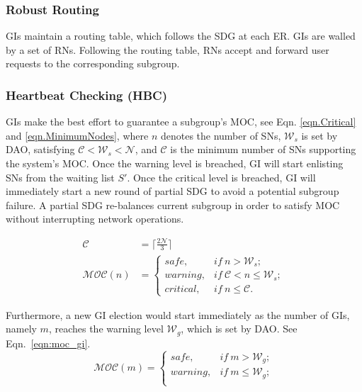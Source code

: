 \subsubsection{Robust Routing}

GIs maintain a routing table, which follows the SDG at each ER. GIs are walled by a set of RNs. Following the routing table, RNs accept and forward user requests to the corresponding subgroup.

\subsubsection{Heartbeat Checking (HBC)}
GIs make the best effort to guarantee a subgroup's MOC, see Eqn. \ref{eqn.Critical} and \ref{eqn.MinimumNodes}, where \(n\) denotes the number of SNs, $\mathcal{W}_s$ is set by DAO, satisfying $\mathcal{C}<\mathcal{W}_s<\mathcal{N}$, and $\mathcal{C}$ is the minimum number of SNs supporting the system's MOC. Once the warning level is breached, GI will start enlisting SNs from the waiting list ${S'}$. Once the critical level is breached, GI will immediately start a new round of partial SDG to avoid a potential subgroup failure. A partial SDG re-balances current subgroup in order to satisfy MOC without interrupting network operations.

\begin{align}
\mathcal{C} &= \lceil \frac{2\mathcal{N}}{3} \rceil \label{eqn.Critical}\\
\mathcal{MOC}(n) &= \begin{cases}
                  safe,     & if \ n > \mathcal{W}_s;\\
                  warning,  & if \ \mathcal{C} < n\le \mathcal{W}_s; \\
        	      critical, & if \ n \le \mathcal{C}.
        		   \end{cases}
\label{eqn.MinimumNodes}
\end{align}

Furthermore, a new GI election would start immediately as the number of GIs, namely $m$, reaches the warning level $\mathcal{W}_g$, which is set by DAO. See Eqn.~\ref{eqn:moc_gi}.
\begin{equation}
\mathcal{MOC}(m) = \begin{cases}
                  safe,     & if \ m > \mathcal{W}_g;\\
                  warning,  & if \ m \le \mathcal{W}_g; \\
        		   \end{cases}
\label{eqn:moc_gi}
\end{equation}

